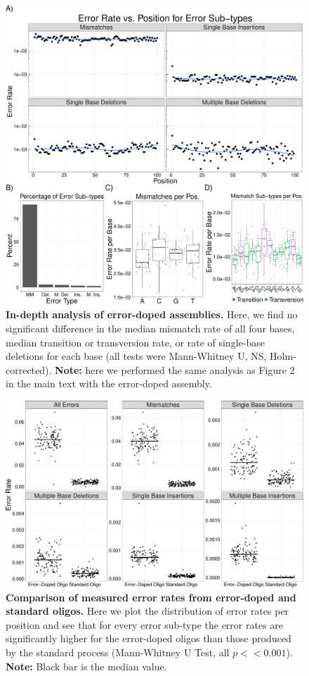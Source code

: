 \documentclass[letterpaper,12pt]{article}
\begin{document}
\clearpage
\begin{figure}[t]
\centering
\includegraphics[width=174mm]{doped_analysis-1.pdf}
\caption{\small \textbf{In-depth analysis of error-doped assemblies.} Here, we find no significant difference in the median mismatch rate of all four bases, median transition or transversion rate, or rate of single-base deletions for each base (all tests were Mann-Whitney U, NS, Holm-corrected). \textbf{Note:} here we performed the same analysis as Figure 2 in the main text with the error-doped assembly.}
\end{figure}

\clearpage
\begin{figure}[t]
\centering
\includegraphics[width=174mm]{Dope_vs_NonDope-1.pdf}
\caption{\small \textbf{Comparison of measured error rates from error-doped and standard oligos.} Here we plot the distribution of error rates per position and see that for every error sub-type the error rates are significantly higher for the error-doped oligos than those produced by the standard process (Mann-Whitney U Test, all $p << 0.001$). \textbf{Note:} Black bar is the median value.}
\end{figure}
\end{document}
